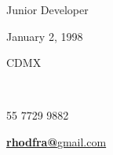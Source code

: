 \documentclass[]{friggeri-cv-theme}
\begin{document}

      {Junior Developer}
      
\vspace{0.3cm}   
\color{lightgray}\noindent\makebox[\textwidth]{\rule{\paperwidth-0.4cm}{2.5pt}}

\begin{info}
  \begin{flushleft}
    {{\small January 2, 1998}\hfill{\LARGE
    \textborn\thinspace\thinspace\verythinspace}\\

    \vspace{0.11cm}

    \small CDMX}\hfill{\Large\faMapMarker\thinspace\thinspace\thinspace}\\

    \vspace{0.08cm}

    {\small 55 7729 9882}\hfill{\LARGE\Mobilefone\thinspace}\\

    \vspace{0.14cm}

    \href{mailto:rhodfra@gmail.com}{%
      {\small\textbf{rhodfra@}gmail.com}\hfill{\Large\Letter}%
      \hspace{0.6mm}{\small \faMousePointer}}\\
  \end{flushleft}
\end{info}

\end{document}
